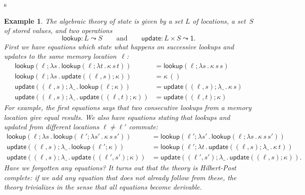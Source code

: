 s\documentclass{amsart}
\newcommand{\lam}[1]{\lambda #1 \,.\,}
\newcommand{\opdecl}[3]{#1 : #2 \leadsto #3} %
\newcommand{\one}{\mathsf{1}} %
\newcommand{\kode}[1]{\mathsf{#1}}
\newcommand{\opcall}[3]{\kode{#1}(#2; #3)}
\newtheorem{example}[definition]{Example}
\begin{document}
\begin{example}
  \label{ex:theory-state}
  The algebraic theory of \emph{state} is given by a set $L$ of
  \emph{locations}, a set~$S$ of stored values, and two operations
  \begin{equation*}
    \opdecl{\kode{lookup}}{L}{S}
    \qquad\text{and}\qquad
    \opdecl{\kode{update}}{L \times S}{\one}.
  \end{equation*}
  First we have equations which state what happens on successive lookups and updates
  to the same memory location~$\ell$:
  \begin{align*}
    \opcall{lookup}{\ell}{
      \lam{s}{
        \opcall{lookup}{\ell}{
        \lam{t} \kappa \, s \, t}
      }
    } &=
    \opcall{lookup}{\ell}{\lam{s}{\kappa \, s \, s}}
    \\
    \opcall{lookup}{\ell}{
      \lam{s} \opcall{update}{(\ell, s)}{\kappa}
    } &=
    \kappa \, ()
    \\
    \opcall{update}{(\ell, s)}{
      \lam{\_} \opcall{lookup}{\ell}{\kappa}
    } &=
    \opcall{update}{(\ell, s)}{\lam{\_} \kappa \, s}
    \\
    \opcall{update}{(\ell, s)}{
      \lam{\_} \opcall{update}{(\ell, t)}{\kappa}
    } &=
    \opcall{update}{(\ell, t)}{\kappa}
  \end{align*}
  For example, the first equations says that two consecutive lookups from a memory
  location give equal results. We also have equations stating that lookups and
  updated from \emph{different} locations $\ell \neq \ell'$ commute:
  \begin{align*}
    \opcall{lookup}{\ell}{
       \lam{s} \opcall{lookup}{\ell'}{\lam{s'} \kappa \, s \, s'}
    } &=
    \opcall{lookup}{\ell'}{
       \lam{s'} \opcall{lookup}{\ell}{\lam{s} \kappa \, s \, s'}
    }
    \\
    \opcall{update}{(\ell, s)}{
       \lam{\_} \opcall{lookup}{\ell'}{\kappa}
    } &=
    \opcall{lookup}{\ell'}{
       \lam{t} \opcall{update}{(\ell, s)}{
          \lam{\_} \kappa \, t
       }
    } \\
    \opcall{update}{(\ell, s)}{
       \lam{\_} \opcall{update}{(\ell', s')}{\kappa}
    } &=
    \opcall{update}{(\ell', s')}{
       \lam{\_} \opcall{update}{(\ell, s)}{\kappa}
    }.
  \end{align*}
  Have we forgotten any equations?
  It turns out that the theory is Hilbert-Post complete: if we add any equation
  that does not already follow from these, the theory trivializes in the sense
  that all equations become derivable.
\end{example}
\end{document}
